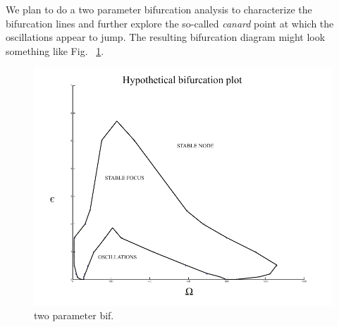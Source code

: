  We plan to do a two parameter bifurcation analysis to characterize the bifurcation lines and further explore the so-called {\textit{canard}} point at which the oscillations appear to jump. The resulting bifurcation diagram might look something like Fig. ~\ref{fig::bifplot}. 

\begin{figure}[h]
\centering
\captionsetup{width=\linewidth}
\includegraphics[width=4.5in]{Project2/figs/Hypothetical_bifurcation_plot.pdf}
\caption{two parameter bif.}
\label{fig::bifplot}
\end{figure}

